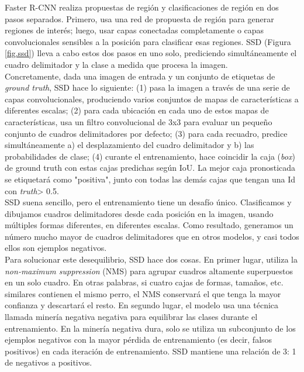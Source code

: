 \documentclass{bmvc2k}
\begin{document}
Faster R-CNN realiza propuestas de región y clasificaciones de región en dos pasos separados. Primero, usa una red de propuesta de región para generar regiones de interés; luego, usar capas conectadas completamente o capas convolucionales sensibles a la posición para clasificar esas regiones. SSD (Figura \ref{fig.ssd}) lleva a cabo estos dos pasos en uno solo, prediciendo simultáneamente el cuadro delimitador y la clase a medida que procesa la imagen.\\

Concretamente, dada una imagen de entrada y un conjunto de etiquetas de \textit{ground truth}, SSD hace lo siguiente: (1) pasa la imagen a través de una serie de capas convolucionales, produciendo varios conjuntos de mapas de características a diferentes escalas; (2) para cada ubicación en cada uno de estos mapas de características, usa un filtro convolucional de 3x3 para evaluar un pequeño conjunto de cuadros delimitadores por defecto; (3) para cada recuadro, predice simultáneamente a) el desplazamiento del cuadro delimitador y b) las probabilidades de clase; (4) curante el entrenamiento, hace coincidir la caja (\textit{box}) de ground truth con estas cajas predichas según IoU. La mejor caja pronosticada se etiquetará como "positiva", junto con todas las demás cajas que tengan una Id con \textit{truth}> 0.5.\\

SSD suena sencillo, pero el entrenamiento tiene un desafío único. Clasificamos y dibujamos cuadros delimitadores desde cada posición en la imagen, usando múltiples formas diferentes, en diferentes escalas. Como resultado, generamos un número mucho mayor de cuadros delimitadores que en otros modelos, y casi todos ellos son ejemplos negativos.\\

Para solucionar este desequilibrio, SSD hace dos cosas. En primer lugar, utiliza la \textit{non-maximum suppression} (NMS) para agrupar cuadros altamente superpuestos en un solo cuadro. En otras palabras, si cuatro cajas de formas, tamaños, etc. similares contienen el mismo perro, el NMS conservará el que tenga la mayor confianza y descartará el resto. En segundo lugar, el modelo usa una técnica llamada minería negativa negativa para equilibrar las clases durante el entrenamiento. En la minería negativa dura, solo se utiliza un subconjunto de los ejemplos negativos con la mayor pérdida de entrenamiento (es decir, falsos positivos) en cada iteración de entrenamiento. SSD mantiene una relación de 3: 1 de negativos a positivos.\\
\end{document}
